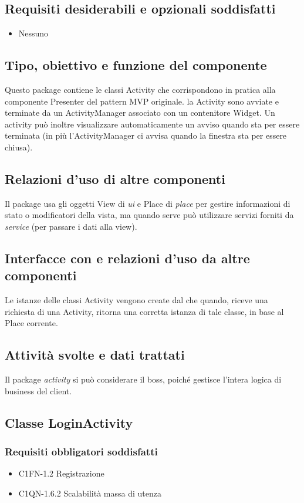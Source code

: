 \subsection*{Requisiti desiderabili e opzionali soddisfatti}
\begin{itemize}
    \item Nessuno
\end{itemize}
\subsection*{Tipo, obiettivo e funzione del componente}
Questo package contiene le classi Activity che corrispondono in pratica alla
componente Presenter del pattern MVP originale. la Activity sono avviate e
terminate da un ActivityManager associato con un contenitore Widget. Un activity
pu\`o inoltre visualizzare automaticamente un avviso quando sta per essere
terminata (in pi\`u l'ActivityManager ci avvisa quando la finestra sta per
essere chiusa).
\subsection*{Relazioni d'uso di altre componenti} Il package usa gli oggetti
View di \emph{ui} e Place di \emph{place} per gestire informazioni di stato o
modificatori della vista, ma quando serve pu\`o utilizzare servizi forniti da
\emph{service} (per passare i dati alla view).
\subsection*{Interfacce con e relazioni d'uso da altre componenti} Le istanze
delle classi Activity vengono create dal  che quando,
riceve una richiesta di una Activity, ritorna una corretta istanza di tale
classe, in base al Place corrente.
\subsection*{Attivit\`a svolte e dati trattati} Il package \emph{activity} si
pu\`o considerare il boss, poich\'e gestisce l'intera logica di business del
client.

\subsection{Classe LoginActivity}
\subsubsection*{Requisiti obbligatori soddisfatti}
\begin{itemize}
	\item C1FN-1.2 Registrazione
	\item C1QN-1.6.2 Scalabilit\`a massa di utenza
\end{itemize}
